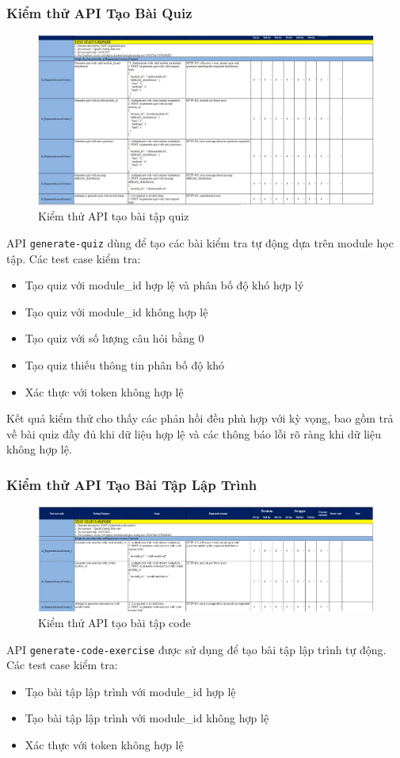 \subsubsection{Kiểm thử API Tạo Bài Quiz}
\begin{figure}[H]
	\centering
	\includegraphics[width=0.8\linewidth]{images/test/test_S1G18.png}
	\caption{Kiểm thử API tạo bài tập quiz}
	\label{fig:testing_quiz}
\end{figure}
API \texttt{generate-quiz} dùng để tạo các bài kiểm tra tự động dựa trên module học tập. Các test case kiểm tra:
\begin{itemize}
    \item Tạo quiz với module\_id hợp lệ và phân bố độ khó hợp lý
    \item Tạo quiz với module\_id không hợp lệ
    \item Tạo quiz với số lượng câu hỏi bằng 0
    \item Tạo quiz thiếu thông tin phân bố độ khó
    \item Xác thực với token không hợp lệ
\end{itemize}

Kết quả kiểm thử cho thấy các phản hồi đều phù hợp với kỳ vọng, bao gồm trả về bài quiz đầy đủ khi dữ liệu hợp lệ và các thông báo lỗi rõ ràng khi dữ liệu không hợp lệ.

\subsubsection{Kiểm thử API Tạo Bài Tập Lập Trình}
\begin{figure}[H]
	\centering
	\includegraphics[width=0.8\linewidth]{images/test/test_S1G19.png}
	\caption{Kiểm thử API tạo bài tập code}
	\label{fig:testting_code}
\end{figure}
API \texttt{generate-code-exercise} được sử dụng để tạo bài tập lập trình tự động. Các test case kiểm tra:
\begin{itemize}
    \item Tạo bài tập lập trình với module\_id hợp lệ
    \item Tạo bài tập lập trình với module\_id không hợp lệ
    \item Xác thực với token không hợp lệ
\end{itemize}


